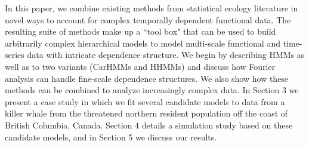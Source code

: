 In this paper, we combine existing methods from statistical ecology literature in novel ways to account for complex temporally dependent functional data. The resulting suite of methods make up a ``tool box" that can be used to build arbitrarily complex hierarchical models to model multi-scale functional and time-series data with intricate dependence structure.
We begin by describing HMMs as well as to two variants (CarHMMs and HHMMs) and discuss how Fourier analysis can handle fine-scale dependence structures. We also show how these methods can be combined to analyze increasingly complex data. In Section 3 we present a case study in which we fit several candidate models to data from a killer whale from the threatened northern resident population off the coast of British Columbia, Canada. Section 4 details a simulation study based on these candidate models, and in Section 5 we discuss our results.